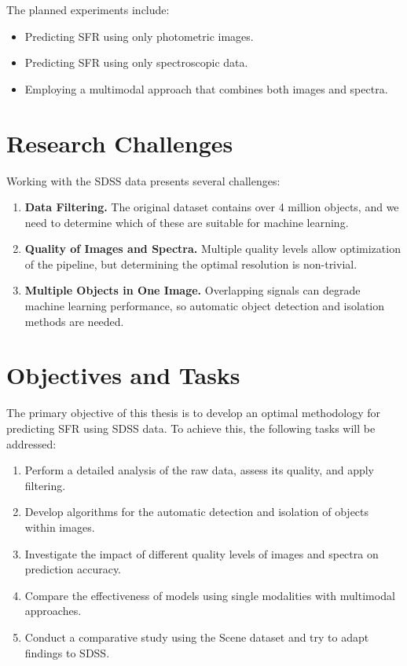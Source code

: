 \documentclass[english,bachelor,oneside]{ctufit-thesis}
\begin{document}
The planned experiments include:
\begin{itemize}
    \item Predicting SFR using only photometric images.
    \item Predicting SFR using only spectroscopic data.
    \item Employing a multimodal approach that combines both images and spectra.
\end{itemize}

\section{Research Challenges}

Working with the SDSS data presents several challenges:
\begin{enumerate}
    \item \textbf{Data Filtering.} The original dataset contains over 4 million objects, and we need to determine which of these are suitable for machine learning.
    \item \textbf{Quality of Images and Spectra.} Multiple quality levels allow optimization of the pipeline, but determining the optimal resolution is non-trivial.
    \item \textbf{Multiple Objects in One Image.} Overlapping signals can degrade machine learning performance, so automatic object detection and isolation methods are needed.
\end{enumerate}

\section{Objectives and Tasks}

The primary objective of this thesis is to develop an optimal methodology for predicting SFR using SDSS data. To achieve this, the following tasks will be addressed:
\begin{enumerate}
    \item Perform a detailed analysis of the raw data, assess its quality, and apply filtering.
    \item Develop algorithms for the automatic detection and isolation of objects within images.
    \item Investigate the impact of different quality levels of images and spectra on prediction accuracy.
    \item Compare the effectiveness of models using single modalities with multimodal approaches.
    \item Conduct a comparative study using the Scene dataset and try to adapt findings to SDSS.
\end{enumerate}
\end{document}
